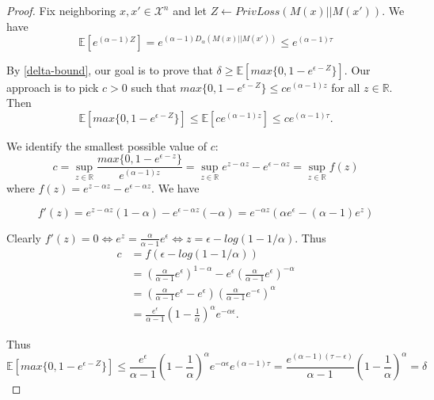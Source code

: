 \documentclass{article}
\begin{document}
\begin{proof}
Fix neighboring $x, x' \in  \mathcal{X}^n$ and let $Z \leftarrow PrivLoss(M(x) || M(x'))$. We have
\begin{equation}
    \mathbb{E}[e^{(\alpha - 1) Z}] = e^{(\alpha - 1)D_\alpha(M(x) || M(x'))} \leq e^{(\alpha - 1)\tau}
\end{equation}

By \ref{delta-bound}, our goal is to prove that $\delta \geq \mathbb{E}[max\{0, 1 - e^{\epsilon - Z} \}]$. 
Our approach is to pick $c > 0$ such that $max\{0, 1 - e^{\epsilon - Z} \} \leq c e^{(\alpha - 1) z}$ for all $z \in \mathbb{R}$. Then
\begin{equation}
    \mathbb{E}[max\{0, 1 - e^{\epsilon - Z} \}] \leq \mathbb{E}[c e^{(\alpha - 1) z}] \leq c e^{(\alpha - 1) \tau}.
\end{equation}

We identify the smallest possible value of $c$:
\begin{equation}
    c = \sup\limits_{z \in \mathbb{R}} \frac{max\{0, 1 - e^{\epsilon - z} \}}{e^{(\alpha -1)z}} 
    = \sup\limits_{z \in \mathbb{R}} e^{z - \alpha z} - e^{\epsilon - \alpha z} 
    = \sup\limits_{z \in \mathbb{R}}f(z)
\end{equation}
where $f(z) = e^{z - \alpha z} - e^{\epsilon - \alpha z}$. We have 

\begin{equation}
    f'(z) = e^{z - \alpha z} (1 - \alpha) - e^{\epsilon - \alpha z}(-\alpha) 
    = e^{-\alpha z} (\alpha e^\epsilon - (\alpha - 1) e^z)
\end{equation}

Clearly $f'(z) = 0 \Longleftrightarrow e^z = \frac{\alpha}{\alpha - 1}e^{\epsilon} \Longleftrightarrow z = \epsilon - log(1 - 1/\alpha)$. Thus
\begin{align}
    c &= f(\epsilon - log(1 - 1 / \alpha)) \\
    &= \left(\frac{\alpha}{\alpha - 1} e^\epsilon \right)^{1 - \alpha} - e^{\epsilon} \left(\frac{\alpha}{\alpha - 1} e^\epsilon \right)^{- \alpha} \\
    &= \left(\frac{\alpha}{\alpha - 1} e^\epsilon  - e^\epsilon \right)  \left(\frac{\alpha}{\alpha - 1} e^{-\epsilon} \right)^{\alpha} \\
    &= \frac{e^\epsilon}{\alpha - 1} \left(1 - \frac{1}{\alpha} \right)^\alpha  e^{-\alpha \epsilon}.
\end{align}

Thus
\begin{equation}
    \mathbb{E}[max\{0, 1 - e^{\epsilon - Z}\}] \leq \frac{e^\epsilon}{\alpha - 1}\left(1  - \frac{1}{\alpha} \right) ^\alpha e^{-\alpha \epsilon} e^{(\alpha -1)\tau}
    = \frac{e^{(\alpha - 1)(\tau - \epsilon)}}{\alpha - 1} \left( 1 - \frac{1}{\alpha} \right)^\alpha
    = \delta
\end{equation}

\end{proof}
\end{document}
